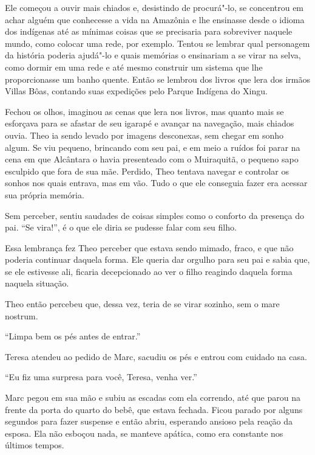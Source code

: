 Ele começou a ouvir mais chiados e, desistindo de procurá"-lo, se
concentrou em achar alguém que conhecesse a vida na Amazônia e lhe
ensinasse desde o idioma dos indígenas até as mínimas coisas que se
precisaria para sobreviver naquele mundo, como colocar uma rede, por
exemplo. Tentou se lembrar qual personagem da história poderia ajudá"-lo
e quais memórias o ensinariam a se virar na selva, como dormir em uma
rede e até mesmo construir um sistema que lhe proporcionasse um banho
quente. Então se lembrou dos livros que lera dos irmãos Villas Bôas,
contando suas expedições pelo Parque Indígena do Xingu.

Fechou os olhos, imaginou as cenas que lera nos livros, mas quanto mais
se esforçava para se afastar de seu igarapé e avançar na navegação, mais
chiados ouvia. Theo ia sendo levado por imagens desconexas, sem chegar
em sonho algum. Se viu pequeno, brincando com seu pai, e em meio a
ruídos foi parar na cena em que Alcântara o havia presenteado com o
Muiraquitã, o pequeno sapo esculpido que fora de sua mãe. Perdido, Theo
tentava navegar e controlar os sonhos nos quais entrava, mas em vão.
Tudo o que ele conseguia fazer era acessar sua própria memória.

Sem perceber, sentiu saudades de coisas simples como o conforto da
presença do pai. ``Se vira!'', é o que ele diria se pudesse falar com
seu filho.

Essa lembrança fez Theo perceber que estava sendo mimado, fraco, e que
não poderia continuar daquela forma. Ele queria dar orgulho para seu pai
e sabia que, se ele estivesse ali, ficaria decepcionado ao ver o filho
reagindo daquela forma naquela situação.

Theo então percebeu que, dessa vez, teria de se virar sozinho, sem o
mare nostrum.

\asterisc


``Limpa bem os pés antes de entrar.''

Teresa atendeu ao pedido de Marc, sacudiu os pés e entrou com cuidado na
casa.

``Eu fiz uma surpresa para você, Teresa, venha ver.''

Marc pegou em sua mão e subiu as escadas com ela correndo, até que parou
na frente da porta do quarto do bebê, que estava fechada. Ficou parado
por alguns segundos para fazer suspense e então abriu, esperando ansioso
pela reação da esposa. Ela não esboçou nada, se manteve apática,
como era constante nos últimos tempos.

